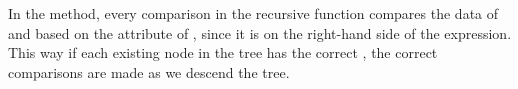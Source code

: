In the  method, every comparison in the recursive  function compares the data of  and  based on the  attribute of , since it is on the right-hand side of the expression.
This way if each existing node in the tree has the correct , the correct comparisons are made as we descend the tree.

